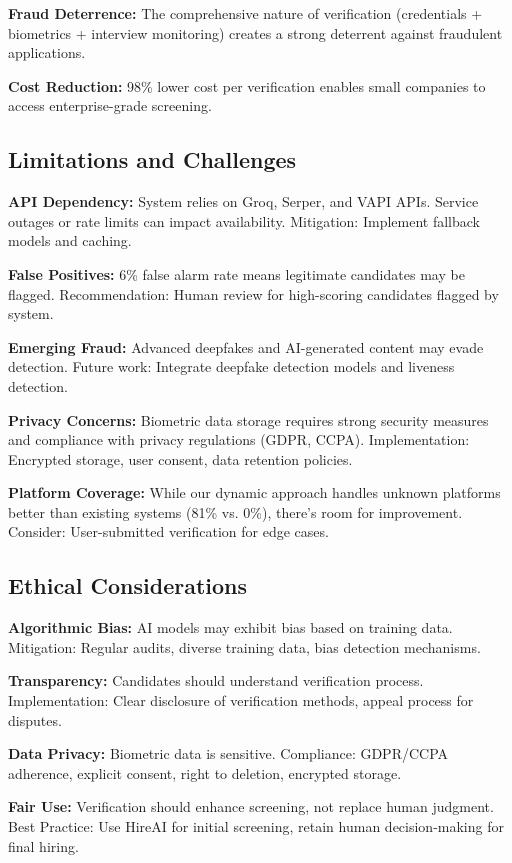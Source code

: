 \documentclass[journal]{IEEEtran}
\begin{document}
\textbf{Fraud Deterrence:} The comprehensive nature of verification (credentials + biometrics + interview monitoring) creates a strong deterrent against fraudulent applications.

\textbf{Cost Reduction:} 98\% lower cost per verification enables small companies to access enterprise-grade screening.

\subsection{Limitations and Challenges}

\textbf{API Dependency:} System relies on Groq, Serper, and VAPI APIs. Service outages or rate limits can impact availability. Mitigation: Implement fallback models and caching.

\textbf{False Positives:} 6\% false alarm rate means legitimate candidates may be flagged. Recommendation: Human review for high-scoring candidates flagged by system.

\textbf{Emerging Fraud:} Advanced deepfakes and AI-generated content may evade detection. Future work: Integrate deepfake detection models and liveness detection.

\textbf{Privacy Concerns:} Biometric data storage requires strong security measures and compliance with privacy regulations (GDPR, CCPA). Implementation: Encrypted storage, user consent, data retention policies.

\textbf{Platform Coverage:} While our dynamic approach handles unknown platforms better than existing systems (81\% vs. 0\%), there's room for improvement. Consider: User-submitted verification for edge cases.

\subsection{Ethical Considerations}

\textbf{Algorithmic Bias:} AI models may exhibit bias based on training data. Mitigation: Regular audits, diverse training data, bias detection mechanisms.

\textbf{Transparency:} Candidates should understand verification process. Implementation: Clear disclosure of verification methods, appeal process for disputes.

\textbf{Data Privacy:} Biometric data is sensitive. Compliance: GDPR/CCPA adherence, explicit consent, right to deletion, encrypted storage.

\textbf{Fair Use:} Verification should enhance screening, not replace human judgment. Best Practice: Use HireAI for initial screening, retain human decision-making for final hiring.
\end{document}
